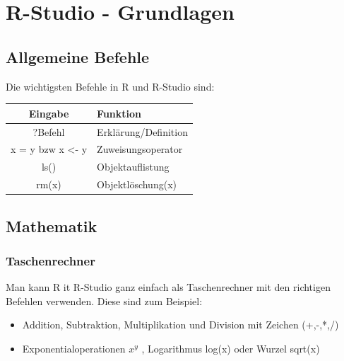 \documentclass[a4paper,10pt]{scrartcl}
\begin{document}
\section{R-Studio - Grundlagen }
\subsection{Allgemeine Befehle}
Die wichtigsten Befehle in R und R-Studio sind:
\begin{table}[H]
    \begin{tabular}{|c|l|}\hline
Eingabe&Funktion\\\hline
?Befehl&Erklärung/Definition\\\hline
x = y bzw x <- y&Zuweisungsoperator\\\hline
ls()&Objektauflistung\\\hline
rm(x)&Objektlöschung(x)\\\hline
    \end{tabular}
    \label{tab:my_label}
\end{table}
\subsection{Mathematik}
\subsubsection{Taschenrechner}
Man kann R it R-Studio ganz einfach als Taschenrechner mit den richtigen Befehlen verwenden. Diese sind zum Beispiel: \newline
\begin{itemize}
    \item Addition, Subtraktion, Multiplikation und Division mit Zeichen (+,-,*,/)
    \item Exponentialoperationen $x^y$ , Logarithmus log(x) oder Wurzel sqrt(x) 
    
\end{itemize}
\end{document}
